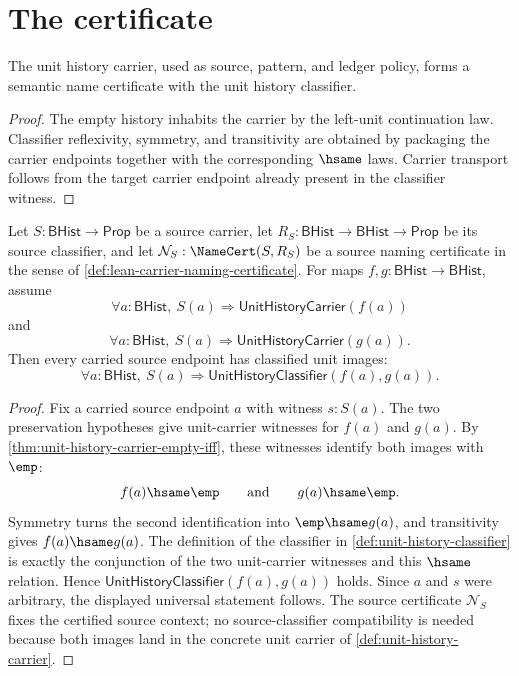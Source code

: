 \section{The certificate}
\label{sec:unit-certificate}

\begin{theorem}
\label{thm:unit-history-classifier-semantic-namecert}
The unit history carrier, used as source, pattern, and ledger policy, forms a
semantic name certificate with the unit history classifier.
\end{theorem}
\begin{proof}
The empty history inhabits the carrier by the left-unit continuation law.
Classifier reflexivity, symmetry, and transitivity are obtained by packaging
the carrier endpoints together with the corresponding $\hsame$ laws. Carrier
transport follows from the target carrier endpoint already present in the
classifier witness.
\end{proof}

\begin{theorem}
\label{thm:unit-terminal-map-uniqueness}
Let $S:\mathsf{BHist}\to\mathsf{Prop}$ be a source carrier, let
$R_S:\mathsf{BHist}\to\mathsf{BHist}\to\mathsf{Prop}$ be its source
classifier, and let $\mathcal{N}_S:\NameCert(S,R_S)$ be a source naming
certificate in the sense of \autoref{def:lean-carrier-naming-certificate}. For
maps $f,g:\mathsf{BHist}\to\mathsf{BHist}$, assume
$$
\forall a:\mathsf{BHist},\ S(a)\Longrightarrow \mathsf{UnitHistoryCarrier}(f(a))
$$
and
$$
\forall a:\mathsf{BHist},\ S(a)\Longrightarrow \mathsf{UnitHistoryCarrier}(g(a)).
$$
Then every carried source endpoint has classified unit images:
$$
\forall a:\mathsf{BHist},\ S(a)\Longrightarrow
\mathsf{UnitHistoryClassifier}(f(a),g(a)).
$$
\end{theorem}
\begin{proof}
Fix a carried source endpoint $a$ with witness $s:S(a)$. The two preservation
hypotheses give unit-carrier witnesses for $f(a)$ and $g(a)$. By
\autoref{thm:unit-history-carrier-empty-iff}, these witnesses identify both
images with $\emp$:
$$
f(a)\hsame\emp
\qquad\text{and}\qquad
g(a)\hsame\emp.
$$
Symmetry turns the second identification into $\emp\hsame g(a)$, and
transitivity gives $f(a)\hsame g(a)$. The definition of the classifier in
\autoref{def:unit-history-classifier} is exactly the conjunction of the two
unit-carrier witnesses and this $\hsame$ relation. Hence
$\mathsf{UnitHistoryClassifier}(f(a),g(a))$ holds. Since $a$ and $s$ were
arbitrary, the displayed universal statement follows. The source certificate
$\mathcal{N}_S$ fixes the certified source context; no source-classifier
compatibility is needed because both images land in the concrete unit carrier
of \autoref{def:unit-history-carrier}.
\end{proof}

